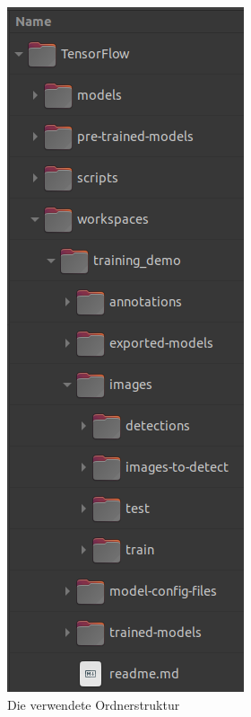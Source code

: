 \documentclass[12pt, oneside]{article}
\begin{document}
\begin{figure}
	\vspace{-1.77cm}
	\centering
	\includegraphics[width=\linewidth]{Bilder/misc/Ordnerstruktur.png}
	\caption{Die verwendete Ordnerstruktur}
	\label{fig:Ordnerstruktur}
\end{figure}
\end{document}
